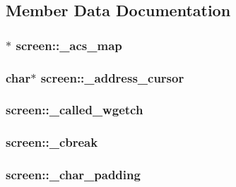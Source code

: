 \subsection{Member Data Documentation}
\hypertarget{structscreen_a0304cb5935007bd733b008b1410592d6}{
\subsubsection[{\-\_\-acs\-\_\-map}]{$\ast$ screen\-::\-\_\-acs\-\_\-map}}\label{structscreen_a0304cb5935007bd733b008b1410592d6}
\hypertarget{structscreen_a5f738e9f7649d812cb1f76fa59950f4a}{
\subsubsection[{\-\_\-address\-\_\-cursor}]{\setlength{\rightskip}{0pt plus 5cm}char$\ast$ screen\-::\-\_\-address\-\_\-cursor}}\label{structscreen_a5f738e9f7649d812cb1f76fa59950f4a}
\hypertarget{structscreen_a80b8c8d054d2021e92be62b3f286f386}{
\subsubsection[{\-\_\-called\-\_\-wgetch}]{ screen\-::\-\_\-called\-\_\-wgetch}}\label{structscreen_a80b8c8d054d2021e92be62b3f286f386}
\hypertarget{structscreen_abebbf63cf8e003136ed94153cdb1124b}{
\subsubsection[{\-\_\-cbreak}]{ screen\-::\-\_\-cbreak}}\label{structscreen_abebbf63cf8e003136ed94153cdb1124b}
\hypertarget{structscreen_a7cc8924c09e2105fa6c1a1d7a4b7782c}{
\subsubsection[{\-\_\-char\-\_\-padding}]{ screen\-::\-\_\-char\-\_\-padding}}\label{structscreen_a7cc8924c09e2105fa6c1a1d7a4b7782c}
